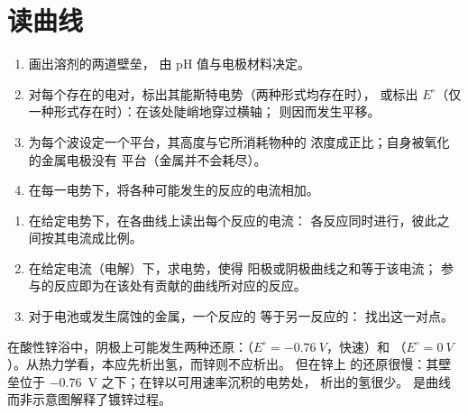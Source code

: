 \section{读曲线}

\begin{method}[绘制溶液的曲线]\label{met:b2:current-potential-curves:sketch-ie}
\begin{enumerate}
  \item 画出溶剂的两道壁垒，
        由 pH 值与电极材料决定。
  \item 对每个存在的电对，标出其能斯特电势（两种形式均存在时），
        或标出 $E^\circ$（仅一种形式存在时）：在该处陡峭地穿过横轴；
        则因而发生平移。
  \item 为每个波设定一个平台，其高度与它所消耗物种的
        浓度成正比；自身被氧化的金属电极没有
        平台（金属并不会耗尽）。
  \item 在每一电势下，将各种可能发生的反应的电流相加。
\end{enumerate}
\end{method}

\begin{method}[读取曲线]\label{met:b2:current-potential-curves:read-ie}
\begin{enumerate}
  \item 在给定电势下，在各曲线上读出每个反应的电流：
        各反应同时进行，彼此之间按其电流成比例。
  \item 在给定电流（电解）下，求电势，使得
        阳极或阴极曲线之和等于该电流；
        参与的反应即为在该处有贡献的曲线所对应的反应。
  \item 对于电池或发生腐蚀的金属，一个反应的
        等于另一反应的：
        找出这一对点。
\end{enumerate}
\end{method}

\begin{example}[从酸性浴中镀锌]\label{ex:b2:current-potential-curves:zinc}
在酸性锌浴中，阴极上可能发生两种还原：（$E^\circ = \qty{-0.76}{V}$，快速）和 
（$E^\circ = \qty{0}{V}$）。从热力学看，本应先析出氢，而锌则不应析出。
但在锌上  的还原很慢：其壁垒位于
\qty{-0.76}{V} 之下；在锌以可用速率沉积的电势处，
析出的氢很少。
是曲线而非示意图解释了镀锌过程。
\end{example}

